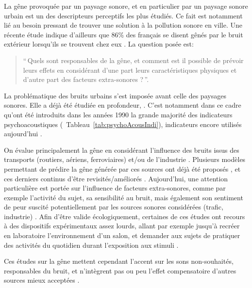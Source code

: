 La gêne provoquée par un paysage sonore, et en particulier par un paysage sonore urbain est un des descripteurs perceptifs les plus étudiés. Ce fait est notamment lié au besoin pressant de trouver une solution à la pollution sonore en ville. Une récente étude indique d'ailleurs que 86\% des français se disent gênés par le bruit extérieur lorsqu'ils se trouvent chez eux \citep{noiseFrench}. La question posée est: \\

\begin{quote}
``\,Quels sont responsables de la gêne, et comment est il possible de prévoir leurs effets en considérant d'une part leurs caractéristiques physiques et d'autre part des facteurs extra-sonores ?\,''.
\end{quote}

La problématique des bruits urbains s'est imposée avant celle des paysages sonores. Elle a déjà été étudiée en profondeur, \citep{marquis2005noisea,marquis2005noiseb}. C'est notamment dans ce cadre qu'ont été introduits dans les années 1990 la grande majorité des indicateurs psychoacoustiques \citep{zwicker2013psychoacoustics}(\cf~Tableau~\ref{tab:psychoAcousIndi}), indicateurs encore utilisés aujourd'hui \citep{hall2013exploratory,fiebig2009psychoacoustic,yang2013psychoacoustical}.

On évalue principalement la gêne en considérant l'influence des bruits issus des transports (routiers, aériens, ferroviaires) et/ou de l'industrie  \citep{gille2016noise,gille2016dose,trolle2015perception,klein2015spectral}. Plusieurs modèles permettant de prédire la gêne générée par ces sources ont déjà été proposés \citep{miedema2001annoyance,miedema2004relationship}, et ces derniers continus d'être revisités/améliorés \citep{gille2016testing}. Aujourd'hui, une attention particulière est portée sur l'influence de facteurs extra-sonores, comme par exemple l'activité du sujet, sa sensibilité au bruit, mais également son sentiment de peur suscité potentiellement par les sources sonores considérées (trafic, industrie) \citep{marquis2015simulated,morel2016noise}. Afin d'être valide écologiquement, certaines de ces études ont recours à des dispositifs expérimentaux assez lourds, allant par exemple jusqu'à recréer en laboratoire l'environnement d'un salon, et demander aux sujets de pratiquer des activités du quotidien durant l'exposition aux stimuli \citep{marquis2015simulated}.

Ces études sur la gêne mettent cependant l'accent sur les sons non-souhaités, responsables du bruit, et n'intègrent pas ou peu l'effet compensatoire d'autres sources mieux acceptées \citep{aletta2016soundscape}.

